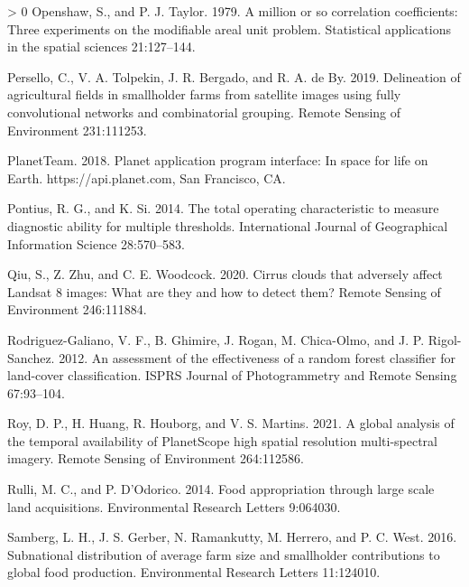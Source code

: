 \documentclass[11pt,a4paper]{article}
\newlength{\cslhangindent}
\newenvironment{CSLReferences}[3] %
 {%
  \setlength{\parindent}{0pt}
  \ifodd #1 \everypar{\setlength{\hangindent}{\cslhangindent}}\ignorespaces\fi
  \ifnum #2 > 0
  \setlength{\parskip}{#2\baselineskip}
  \fi
 }%
 {}
\begin{document}
\begin{CSLReferences}{1}{0}
\leavevmode\hypertarget{ref-Openshawmillioncorrelationcoefficients1979}{}%
Openshaw, S., and P. J. Taylor. 1979. A million or so correlation
coefficients: Three experiments on the modifiable areal unit problem.
Statistical applications in the spatial sciences 21:127--144.

\leavevmode\hypertarget{ref-perselloDelineationAgriculturalFields2019}{}%
Persello, C., V. A. Tolpekin, J. R. Bergado, and R. A. de By. 2019.
Delineation of agricultural fields in smallholder farms from satellite
images using fully convolutional networks and combinatorial grouping.
Remote Sensing of Environment 231:111253.

\leavevmode\hypertarget{ref-planetteamPlanetApplicationProgram2018}{}%
PlanetTeam. 2018. Planet application program interface: In space for
life on {Earth}. {https://api.planet.com}, {San Francisco, CA}.

\leavevmode\hypertarget{ref-Pontiustotaloperatingcharacteristic2014}{}%
Pontius, R. G., and K. Si. 2014. The total operating characteristic to
measure diagnostic ability for multiple thresholds. International
Journal of Geographical Information Science 28:570--583.

\leavevmode\hypertarget{ref-qiuCirrusCloudsThat2020}{}%
Qiu, S., Z. Zhu, and C. E. Woodcock. 2020. Cirrus clouds that adversely
affect {Landsat} 8 images: What are they and how to detect them? Remote
Sensing of Environment 246:111884.

\leavevmode\hypertarget{ref-rodriguez-galianoAssessmentEffectivenessRandom2012}{}%
Rodriguez-Galiano, V. F., B. Ghimire, J. Rogan, M. Chica-Olmo, and J. P.
Rigol-Sanchez. 2012. An assessment of the effectiveness of a random
forest classifier for land-cover classification. ISPRS Journal of
Photogrammetry and Remote Sensing 67:93--104.

\leavevmode\hypertarget{ref-royGlobalAnalysisTemporal2021}{}%
Roy, D. P., H. Huang, R. Houborg, and V. S. Martins. 2021. A global
analysis of the temporal availability of {PlanetScope} high spatial
resolution multi-spectral imagery. Remote Sensing of Environment
264:112586.

\leavevmode\hypertarget{ref-RulliFoodappropriationlarge2014}{}%
Rulli, M. C., and P. D'Odorico. 2014. Food appropriation through large
scale land acquisitions. Environmental Research Letters 9:064030.

\leavevmode\hypertarget{ref-SambergSubnationaldistributionaverage2016}{}%
Samberg, L. H., J. S. Gerber, N. Ramankutty, M. Herrero, and P. C. West.
2016. Subnational distribution of average farm size and smallholder
contributions to global food production. Environmental Research Letters
11:124010.


\end{CSLReferences}
\end{document}
